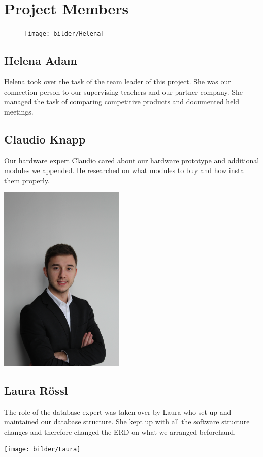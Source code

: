 \chapter*{Project Members}
\begin{figure}
    \texttt{[image: bilder/Helena]}
\end{figure}
\section*{Helena Adam}
Helena took over the task of the team leader of this project. She was our connection person to our supervising teachers and our partner company. She managed the task of comparing competitive products and documented held meetings.
\section*{Claudio Knapp}
Our hardware expert Claudio cared about our hardware prototype and additional modules we appended. He researched on what modules to buy and how install them properly. 
\begin{center}
\includegraphics[width=0.45\textwidth, angle =-90]{bilder/Claudio}
\end{center}
\section*{Laura Rössl}
The role of the database expert was taken over by Laura who set up and maintained our database structure. She kept up with all the software structure changes and therefore changed the ERD on what we arranged beforehand. 
\begin{center}
\texttt{[image: bilder/Laura]}
\end{center}
